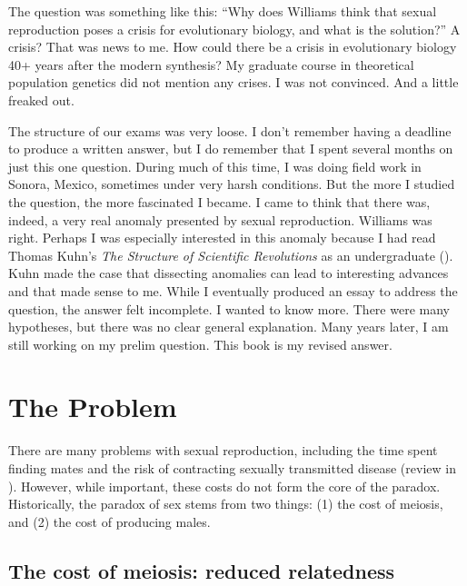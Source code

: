 \documentclass[
  letterpaper,
]{book}
\begin{document}
The question was something like this: ``Why does Williams think that
sexual reproduction poses a crisis for evolutionary biology, and what is
the solution?'' A crisis? That was news to me. How could there be a
crisis in evolutionary biology 40+ years after the modern synthesis? My
graduate course in theoretical population genetics did not mention any
crises. I was not convinced. And a little freaked out.

The structure of our exams was very loose. I don't remember having a
deadline to produce a written answer, but I do remember that I spent
several months on just this one question. During much of this time, I
was doing field work in Sonora, Mexico, sometimes under very harsh
conditions. But the more I studied the question, the more fascinated I
became. I came to think that there was, indeed, a very real anomaly
presented by sexual reproduction. Williams was right. Perhaps I was
especially interested in this anomaly because I had read Thomas Kuhn's
\emph{The Structure of Scientific Revolutions} as an undergraduate
(). Kuhn made the case that dissecting
anomalies can lead to interesting advances and that made sense to me.
While I eventually produced an essay to address the question, the answer
felt incomplete. I wanted to know more. There were many hypotheses, but
there was no clear general explanation. Many years later, I am still
working on my prelim question. This book is my revised answer.

\section{The Problem}\label{the-problem}

There are many problems with sexual reproduction, including the time
spent finding mates and the risk of contracting sexually transmitted
disease (review in ). However, while important, these costs do not form the core of
the paradox. Historically, the paradox of sex stems from two things: (1)
the cost of meiosis, and (2) the cost of producing males.

\subsection{The cost of meiosis: reduced
relatedness}\label{the-cost-of-meiosis-reduced-relatedness}
\end{document}
